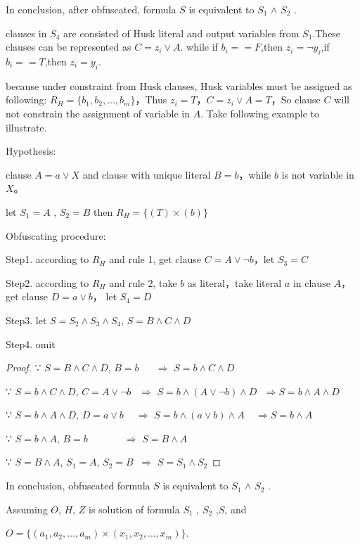 \documentclass[runningheads,a4paper]{llncs}
\begin{document}
In conclusion, after obfuscated, formula $S$ is equivalent to $S_1$ $\wedge$  $S_2$ . 

clauses in $S_4$ are consisted of Husk literal and output variables from $S_1$.These clauses can be represented as $C= z_i\vee A$. while if $b_i==F$,then $z_i= \neg y_i$,if $b_i ==T$,then $z_i =y_i$.

because under constraint from Husk clauses, Husk variables  must be assigned as following: 
$R_H=\{b_1,b_2,\dots,b_m\}$，Thus $z_i=T$，$C=z_i\vee A=T$，So clause $C$ will not constrain the assignment of variable in $A$.
Take following example to illustrate.

\noindent Hypothesis: 

clause $A=a\vee X$ and clause with unique literal $B=b$，while $b$ is not variable in $X$。

let $S_1=A$ , $S_2=B$  then $R_H=\{(T)\times(b)\}$ 

\noindent Obfuscating procedure:

Step1. according to $R_H$ and rule 1, get clause $C=A\vee \neg b$，let $S_3=C$

Step2. according to $R_H$ and rule 2, take $b$ as literal，take literal $a$ in clause $A$，get clause $D=a\vee b$， let $S_4=D$

Step3. let $S=S_2 \wedge S_3\wedge S_4$, $S=B\wedge C\wedge D$

Step4. omit

\begin{proof}

∵ $S=B\wedge C\wedge D$, $B=b$ $~~~~~~\Longrightarrow$ $S=b\wedge C\wedge D$

∵ $S=b\wedge C\wedge D$, $C=A\vee \neg b$ $~~\Longrightarrow$ $S=b\wedge (A\vee \neg b)\wedge D ~~~\Longrightarrow S=b\wedge A\wedge D$

∵ $S=b\wedge A\wedge D$,  $D=a\vee b$  $~~~~\Longrightarrow$ $S=b\wedge (a\vee b)\wedge A ~~~~~\Longrightarrow S=b\wedge A$

∵ $S=b\wedge A$, $B=b$  $~~~~~~~~~~~~~~~\Longrightarrow$ $S= B\wedge A$ 

∵ $S=B\wedge A$,    $S_1=A$,  $S_2=B$   $~\Longrightarrow$ $S= S_1\wedge S_2$ 
\end{proof}

In conclusion, obfuscated formula $S$ is equivalent to $S_1$ $\wedge$  $S_2$ .

Assuming $O$, $H$, $Z$ is solution of formula $S_1$ , $S_2$ ,$S$, and

$O=\{(a_1,a_2,\dots,a_m)\times(x_1,x_2,\dots,x_m)\}$. 
\end{document}

